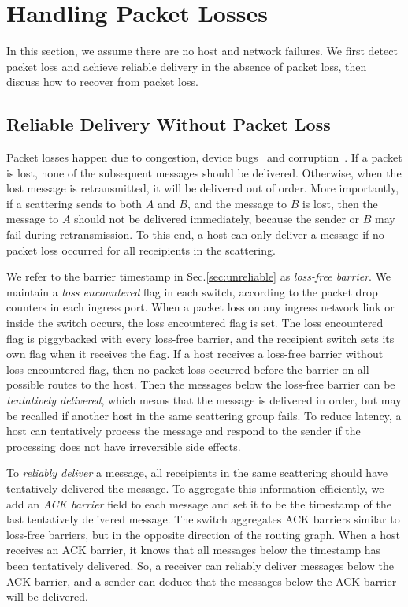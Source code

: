 {\fi

\iffalse
\section{Handling Packet Losses}
\label{sec:packet-loss}

In this section, we assume there are no host and network failures. We first detect packet loss and achieve reliable delivery in the absence of packet loss, then discuss how to recover from packet loss.

\subsection{Reliable Delivery Without Packet Loss}
\label{sec:ack-barrier}

Packet losses happen due to congestion, device bugs~\cite{guo2015pingmesh} and corruption~\cite{zhuo2017understanding}.
If a packet is lost, none of the subsequent messages should be delivered.
Otherwise, when the lost message is retransmitted, it will be delivered out of order.
More importantly, if a scattering sends to both $A$ and $B$, and the message to $B$ is lost, then the message to $A$ should not be delivered immediately, because the sender or $B$ may fail during retransmission.
To this end, a host can only deliver a message if no packet loss occurred for all receipients in the scattering.

We refer to the barrier timestamp in Sec.\ref{sec:unreliable} as \emph{loss-free barrier}.
We maintain a \emph{loss encountered} flag in each switch, according to the packet drop counters in each ingress port.
When a packet loss on any ingress network link or inside the switch occurs, the loss encountered flag is set.
The loss encountered flag is piggybacked with every loss-free barrier, and the receipient switch sets its own flag when it receives the flag.
If a host receives a loss-free barrier without loss encountered flag, then no packet loss occurred before the barrier on all possible routes to the host.
Then the messages below the loss-free barrier can be \emph{tentatively delivered}, which means that the message is delivered in order, but may be recalled if another host in the same scattering group fails.
To reduce latency, a host can tentatively process the message and respond to the sender if the processing does not have irreversible side effects.

To \emph{reliably deliver} a message, all receipients in the same scattering should have tentatively delivered the message.
To aggregate this information efficiently, we add an \emph{ACK barrier} field to each message and set it to be the timestamp of the last tentatively delivered message.
The switch aggregates ACK barriers similar to loss-free barriers, but in the opposite direction of the routing graph.
When a host receives an ACK barrier, it knows that all messages below the timestamp has been tentatively delivered.
So, a receiver can reliably deliver messages below the ACK barrier, and a sender can deduce that the messages below the ACK barrier will be delivered.

}
